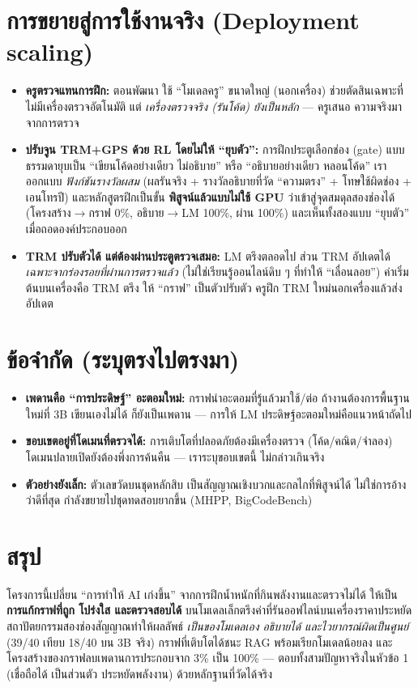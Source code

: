 \documentclass[fontsize=16pt,a4paper]{scrartcl}
\begin{document}
\section{การขยายสู่การใช้งานจริง (Deployment scaling)}
\begin{itemize}
\item \textbf{ครูตรวจแทนการฝึก:} ตอนพัฒนา ใช้ ``โมเดลครู'' ขนาดใหญ่ (นอกเครื่อง) ช่วยตัดสินเฉพาะที่ไม่มีเครื่องตรวจอัตโนมัติ แต่ \emph{เครื่องตรวจจริง (รันโค้ด) ยังเป็นหลัก} --- ครูเสนอ ความจริงมาจากการตรวจ
\item \textbf{ปรับจูน TRM+GPS ด้วย RL โดยไม่ให้ ``ยุบตัว'':} การฝึกประตูเลือกช่อง (gate) แบบธรรมดายุบเป็น ``เขียนโค้ดอย่างเดียว ไม่อธิบาย'' หรือ ``อธิบายอย่างเดียว หลอนโค้ด'' เราออกแบบ \emph{ฟังก์ชันรางวัลผสม} (ผลรันจริง + รางวัลอธิบายที่วัด ``ความตรง'' + โทษใช้ผิดช่อง + เอนโทรปี) และหลักสูตรฝึกเป็นขั้น \textbf{พิสูจน์แล้วแบบไม่ใช้ GPU} ว่าเข้าสู่จุดสมดุลสองช่องได้ (โครงสร้าง$\to$กราฟ 0\%, อธิบาย$\to$LM 100\%, ผ่าน 100\%) และเห็นทั้งสองแบบ ``ยุบตัว'' เมื่อถอดองค์ประกอบออก
\item \textbf{TRM ปรับตัวได้ แต่ต้องผ่านประตูตรวจเสมอ:} LM ตรึงตลอดไป ส่วน TRM อัปเดตได้ \emph{เฉพาะจากร่องรอยที่ผ่านการตรวจแล้ว} (ไม่ใช่เรียนรู้ออนไลน์ดิบ ๆ ที่ทำให้ ``เลื่อนลอย'') ค่าเริ่มต้นบนเครื่องคือ TRM ตรึง ให้ ``กราฟ'' เป็นตัวปรับตัว ครูฝึก TRM ใหม่นอกเครื่องแล้วส่งอัปเดต
\end{itemize}

\section{ข้อจำกัด (ระบุตรงไปตรงมา)}
\begin{itemize}
\item \textbf{เพดานคือ ``การประดิษฐ์'' อะตอมใหม่:} กราฟนำอะตอมที่รู้แล้วมาใช้/ต่อ ถ้างานต้องการพื้นฐานใหม่ที่ 3B เขียนเองไม่ได้ ก็ยังเป็นเพดาน --- การให้ LM ประดิษฐ์อะตอมใหม่คือแนวหน้าถัดไป
\item \textbf{ขอบเขตอยู่ที่โดเมนที่ตรวจได้:} การเติบโตที่ปลอดภัยต้องมีเครื่องตรวจ (โค้ด/คณิต/จำลอง) โดเมนปลายเปิดยังต้องพึ่งการค้นคืน --- เราระบุขอบเขตนี้ ไม่กล่าวเกินจริง
\item \textbf{ตัวอย่างยังเล็ก:} ตัวเลขวัดบนชุดหลักสิบ เป็นสัญญาณเชิงบวกและกลไกที่พิสูจน์ได้ ไม่ใช่การอ้างว่าดีที่สุด กำลังขยายไปชุดทดสอบยากขึ้น (MHPP, BigCodeBench)
\end{itemize}

\section{สรุป}
โครงการนี้เปลี่ยน ``การทำให้ AI เก่งขึ้น'' จากการฝึกน้ำหนักที่กินพลังงานและตรวจไม่ได้ ให้เป็น \textbf{การแก้กราฟที่ถูก โปร่งใส และตรวจสอบได้} บนโมเดลเล็กตรึงค่าที่รันออฟไลน์บนเครื่องราคาประหยัด สถาปัตยกรรมสองช่องสัญญาณทำให้ผลลัพธ์ \emph{เป็นของโมเดลเอง อธิบายได้ และไวยากรณ์ผิดเป็นศูนย์} (39/40 เทียบ 18/40 บน 3B จริง) กราฟที่เติบโตได้ชนะ RAG พร้อมเรียกโมเดลน้อยลง และโครงสร้างของกราฟลบเพดานการประกอบจาก 3\% เป็น 100\% --- ตอบทั้งสามปัญหาจริงในหัวข้อ 1 (เชื่อถือได้ เป็นส่วนตัว ประหยัดพลังงาน) ด้วยหลักฐานที่วัดได้จริง

\vfill{}
\end{document}
